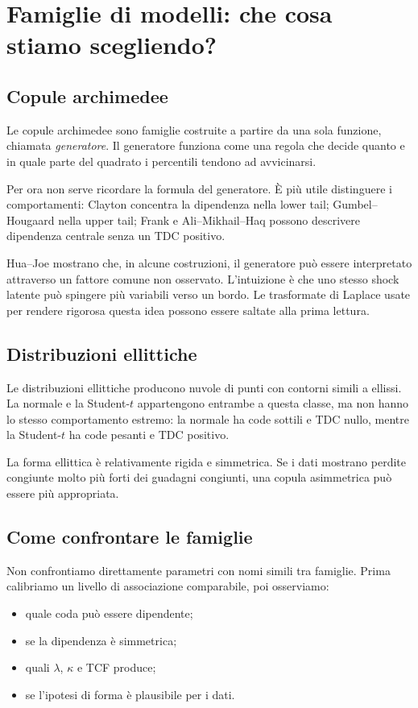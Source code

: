\documentclass[11pt,a4paper]{article}
\begin{document}
\section{Famiglie di modelli: che cosa stiamo scegliendo?}

\subsection{Copule archimedee}

Le copule archimedee sono famiglie costruite a partire da una sola funzione,
chiamata \emph{generatore}. Il generatore funziona come una regola che decide
quanto e in quale parte del quadrato i percentili tendono ad avvicinarsi.

Per ora non serve ricordare la formula del generatore. È più utile distinguere
i comportamenti: Clayton concentra la dipendenza nella lower tail;
Gumbel--Hougaard nella upper tail; Frank e Ali--Mikhail--Haq possono descrivere
dipendenza centrale senza un TDC positivo.

Hua--Joe mostrano che, in alcune costruzioni, il generatore può essere
interpretato attraverso un fattore comune non osservato. L'intuizione è che
uno stesso shock latente può spingere più variabili verso un bordo. Le
trasformate di Laplace usate per rendere rigorosa questa idea possono essere
saltate alla prima lettura.

\subsection{Distribuzioni ellittiche}

Le distribuzioni ellittiche producono nuvole di punti con contorni simili a
ellissi. La normale e la Student-$t$ appartengono entrambe a questa classe, ma
non hanno lo stesso comportamento estremo: la normale ha code sottili e TDC
nullo, mentre la Student-$t$ ha code pesanti e TDC positivo.

La forma ellittica è relativamente rigida e simmetrica. Se i dati mostrano
perdite congiunte molto più forti dei guadagni congiunti, una copula
asimmetrica può essere più appropriata.

\subsection{Come confrontare le famiglie}

Non confrontiamo direttamente parametri con nomi simili tra famiglie. Prima
calibriamo un livello di associazione comparabile, poi osserviamo:
\begin{itemize}
  \item quale coda può essere dipendente;
  \item se la dipendenza è simmetrica;
  \item quali $\lambda$, $\kappa$ e TCF produce;
  \item se l'ipotesi di forma è plausibile per i dati.
\end{itemize}
\end{document}
